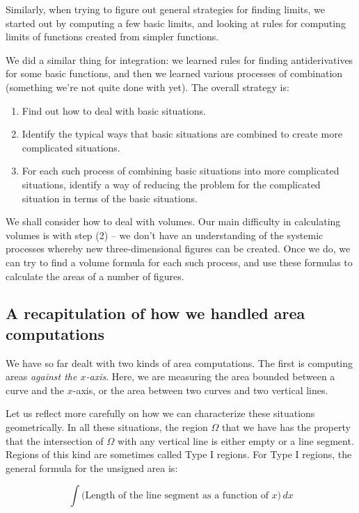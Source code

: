 \documentclass[10pt]{amsart}
\begin{document}
Similarly, when trying to figure out general strategies for finding
limits, we started out by computing a few basic limits, and looking at
rules for computing limits of functions created from simpler functions.

We did a similar thing for integration: we learned rules for finding
antiderivatives for some basic functions, and then we learned various
processes of combination (something we're not quite done with
yet). The overall strategy is:

\begin{enumerate}
\item Find out how to deal with basic situations.
\item Identify the typical ways that basic situations are combined to
  create more complicated situations.
\item For each such process of combining basic situations into more
  complicated situations, identify a way of reducing the problem for
  the complicated situation in terms of the basic situations.
\end{enumerate}

We shall consider how to deal with volumes. Our main difficulty in
calculating volumes is with step (2) -- we don't have an understanding
of the systemic processes whereby new three-dimensional figures can be
created. Once we do, we can try to find a volume formula for each such
process, and use these formulas to calculate the areas of a number of
figures.

\subsection{A recapitulation of how we handled area computations}

We have so far dealt with two kinds of area computations. The first is
computing areas {\em against the $x$-axis}. Here, we are measuring the
area bounded between a curve and the $x$-axis, or the area between two
curves and two vertical lines.

Let us reflect more carefully on how we can characterize these
situations geometrically. In all these situations, the region $\Omega$
that we have has the property that the intersection of $\Omega$ with
any vertical line is either empty or a line segment. Regions of this
kind are sometimes called Type I regions. For Type I regions, the
general formula for the unsigned area is:

$$\int \text{(Length of the line segment as a function of $x$)} \, dx$$
\end{document}
